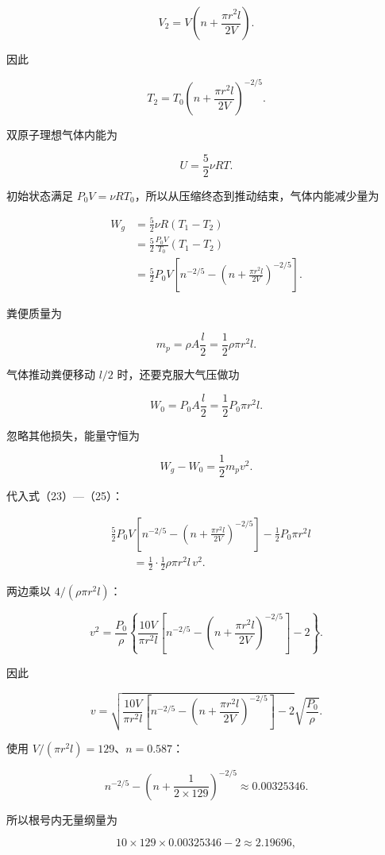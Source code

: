 \documentclass[12pt,a4paper,UTF8]{ctexart}
\begin{document}
\[
V_2=V\left(n+\frac{\pi r^2l}{2V}\right).
\]

因此

\[
\boxed{
T_2=T_0\left(n+\frac{\pi r^2l}{2V}\right)^{-2/5}
}.
\tag{22}
\]

双原子理想气体内能为

\[
U=\frac52\nu RT.
\]

初始状态满足
\(P_0V=\nu RT_0\)，所以从压缩终态到推动结束，气体内能减少量为

\[
\begin{aligned}
W_g
&=\frac52\nu R(T_1-T_2)\\
&=\frac52\frac{P_0V}{T_0}(T_1-T_2)\\
&=\frac52P_0V\left[
n^{-2/5}
-\left(n+\frac{\pi r^2l}{2V}\right)^{-2/5}
\right].
\end{aligned}
\tag{23}
\]

粪便质量为

\[
m_p=\rho A\frac l2=\frac12\rho\pi r^2l.
\tag{24}
\]

气体推动粪便移动 \(l/2\) 时，还要克服大气压做功

\[
W_0=P_0A\frac l2=\frac12P_0\pi r^2l.
\tag{25}
\]

忽略其他损失，能量守恒为

\[
W_g-W_0=\frac12m_pv^2.
\tag{26}
\]

代入式（23）---（25）：

\[
\begin{aligned}
&\frac52P_0V\left[
n^{-2/5}
-\left(n+\frac{\pi r^2l}{2V}\right)^{-2/5}
\right]
-\frac12P_0\pi r^2l\\
&\qquad=\frac12\cdot\frac12\rho\pi r^2l\,v^2.
\end{aligned}
\]

两边乘以 \(4/(\rho\pi r^2l)\)：

\[
v^2=\frac{P_0}{\rho}\left\{
\frac{10V}{\pi r^2l}\left[
n^{-2/5}
-\left(n+\frac{\pi r^2l}{2V}\right)^{-2/5}
\right]-2
\right\}.
\]

因此

\[
\boxed{
v=\sqrt{
\frac{10V}{\pi r^2l}\left[
n^{-2/5}
-\left(n+\frac{\pi r^2l}{2V}\right)^{-2/5}
\right]-2
}\sqrt{\frac{P_0}{\rho}}
}.
\tag{27}
\]

使用 \(V/(\pi r^2l)=129\)、\(n=0.587\)：

\[
n^{-2/5}-\left(n+\frac1{2\times129}\right)^{-2/5}
\approx0.00325346.
\]

所以根号内无量纲量为

\[
10\times129\times0.00325346-2\approx2.19696,
\]
\end{document}
